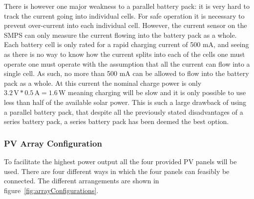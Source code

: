 \documentclass[a4paper]{article}
\newcommand{\unit}[1]{\ensuremath{\, \mathrm{#1}}}
\begin{document}
There is however one major weakness to a parallel battery pack: 
it is very hard to track the current going into individual cells. For 
safe operation it is necessary to prevent over-current into each individual 
cell. However, the current sensor on the SMPS can only measure the current 
flowing into the battery pack as a whole. Each battery cell is only rated 
for a rapid charging current of 500 mA\cite{batteryDatasheet},  and seeing 
as there is no way to know how the current splits into each of the cells 
one must operate one must operate with the assumption that all the current 
can flow into a single cell. As such, no more than 500 mA can be allowed 
to flow into the battery pack as a whole. At this current the nominal 
charge power is only \(3.2 \unit{V} * 0.5 \unit{A} = 1.6 \unit{W} \)
 meaning charging will be slow and it is only possible to use less than half of the available solar power. 
This is such a large drawback of using a parallel battery pack, that 
despite all the previously stated disadvantages of a series battery pack, 
a series battery pack has been deemed the best option.

\subsubsection{PV Array Configuration}

To facilitate the highest power output all the four provided PV panels will be used.
 There are four different ways in which the four panels can feasibly be connected. 
 The different arrangements are shown in figure~\ref{fig:arrayConfigurations}.
\end{document}
